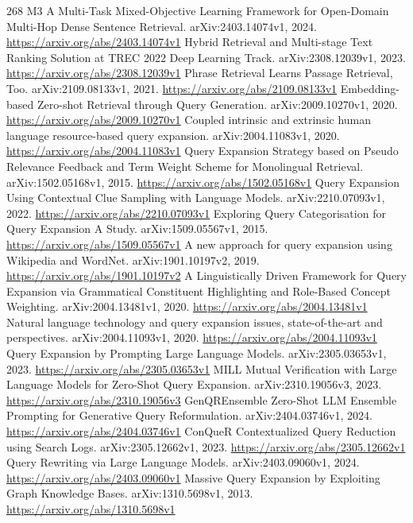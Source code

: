 \documentclass[11pt]{article}
\begin{document}
\begin{thebibliography}{268}
 M3 A Multi-Task Mixed-Objective Learning Framework for Open-Domain Multi-Hop Dense Sentence Retrieval. arXiv:2403.14074v1, 2024. \url{https://arxiv.org/abs/2403.14074v1}
 Hybrid Retrieval and Multi-stage Text Ranking Solution at TREC 2022 Deep Learning Track. arXiv:2308.12039v1, 2023. \url{https://arxiv.org/abs/2308.12039v1}
 Phrase Retrieval Learns Passage Retrieval, Too. arXiv:2109.08133v1, 2021. \url{https://arxiv.org/abs/2109.08133v1}
 Embedding-based Zero-shot Retrieval through Query Generation. arXiv:2009.10270v1, 2020. \url{https://arxiv.org/abs/2009.10270v1}
 Coupled intrinsic and extrinsic human language resource-based query expansion. arXiv:2004.11083v1, 2020. \url{https://arxiv.org/abs/2004.11083v1}
 Query Expansion Strategy based on Pseudo Relevance Feedback and Term Weight Scheme for Monolingual Retrieval. arXiv:1502.05168v1, 2015. \url{https://arxiv.org/abs/1502.05168v1}
 Query Expansion Using Contextual Clue Sampling with Language Models. arXiv:2210.07093v1, 2022. \url{https://arxiv.org/abs/2210.07093v1}
 Exploring Query Categorisation for Query Expansion A Study. arXiv:1509.05567v1, 2015. \url{https://arxiv.org/abs/1509.05567v1}
 A new approach for query expansion using Wikipedia and WordNet. arXiv:1901.10197v2, 2019. \url{https://arxiv.org/abs/1901.10197v2}
 A Linguistically Driven Framework for Query Expansion via Grammatical Constituent Highlighting and Role-Based Concept Weighting. arXiv:2004.13481v1, 2020. \url{https://arxiv.org/abs/2004.13481v1}
 Natural language technology and query expansion issues, state-of-the-art and perspectives. arXiv:2004.11093v1, 2020. \url{https://arxiv.org/abs/2004.11093v1}
 Query Expansion by Prompting Large Language Models. arXiv:2305.03653v1, 2023. \url{https://arxiv.org/abs/2305.03653v1}
 MILL Mutual Verification with Large Language Models for Zero-Shot Query Expansion. arXiv:2310.19056v3, 2023. \url{https://arxiv.org/abs/2310.19056v3}
 GenQREnsemble Zero-Shot LLM Ensemble Prompting for Generative Query Reformulation. arXiv:2404.03746v1, 2024. \url{https://arxiv.org/abs/2404.03746v1}
 ConQueR Contextualized Query Reduction using Search Logs. arXiv:2305.12662v1, 2023. \url{https://arxiv.org/abs/2305.12662v1}
 Query Rewriting via Large Language Models. arXiv:2403.09060v1, 2024. \url{https://arxiv.org/abs/2403.09060v1}
 Massive Query Expansion by Exploiting Graph Knowledge Bases. arXiv:1310.5698v1, 2013. \url{https://arxiv.org/abs/1310.5698v1}

\end{thebibliography}
\end{document}
